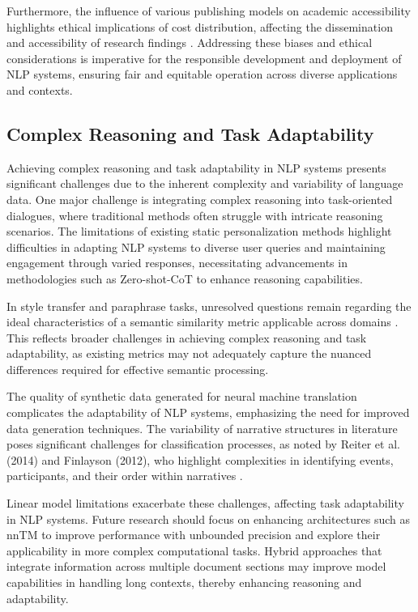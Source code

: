 Furthermore, the influence of various publishing models on academic accessibility highlights ethical implications of cost distribution, affecting the dissemination and accessibility of research findings \cite{cohen2015costreadingresearchstudy}. Addressing these biases and ethical considerations is imperative for the responsible development and deployment of NLP systems, ensuring fair and equitable operation across diverse applications and contexts.

\subsection{Complex Reasoning and Task Adaptability} \label{subsec:Complex Reasoning and Task Adaptability}

Achieving complex reasoning and task adaptability in NLP systems presents significant challenges due to the inherent complexity and variability of language data. One major challenge is integrating complex reasoning into task-oriented dialogues, where traditional methods often struggle with intricate reasoning scenarios. The limitations of existing static personalization methods \cite{kaur2024cropcontextwiserobuststatic} highlight difficulties in adapting NLP systems to diverse user queries and maintaining engagement through varied responses, necessitating advancements in methodologies such as Zero-shot-CoT to enhance reasoning capabilities.

In style transfer and paraphrase tasks, unresolved questions remain regarding the ideal characteristics of a semantic similarity metric applicable across domains \cite{yamshchikov2020styletransferparaphraselookingsensible}. This reflects broader challenges in achieving complex reasoning and task adaptability, as existing metrics may not adequately capture the nuanced differences required for effective semantic processing.

The quality of synthetic data generated for neural machine translation complicates the adaptability of NLP systems, emphasizing the need for improved data generation techniques. The variability of narrative structures in literature poses significant challenges for classification processes, as noted by Reiter et al. (2014) and Finlayson (2012), who highlight complexities in identifying events, participants, and their order within narratives \cite{jannidis2016analyzingfeaturesdetectionhappy}.

Linear model limitations exacerbate these challenges, affecting task adaptability in NLP systems. Future research should focus on enhancing architectures such as nnTM to improve performance with unbounded precision and explore their applicability in more complex computational tasks. Hybrid approaches that integrate information across multiple document sections may improve model capabilities in handling long contexts, thereby enhancing reasoning and adaptability.


